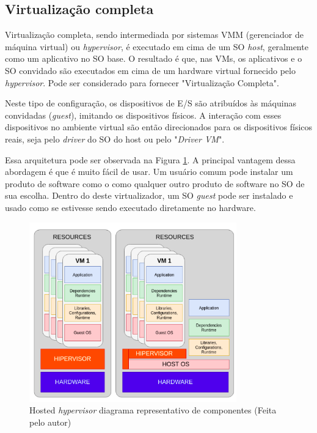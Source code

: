 \subsection{Virtualização completa}

Virtualização completa, sendo intermediada por sistemas VMM (gerenciador de máquina virtual) ou \emph{hypervisor}, é executado em cima de um SO \emph{host}, geralmente como um aplicativo no SO base. O resultado é que, nas VMs, os aplicativos e o SO convidado são executados em cima de um hardware virtual fornecido pelo \emph{hypervisor}. Pode ser considerado para fornecer "Virtualização Completa".

Neste tipo de configuração, os dispositivos de E/S são atribuídos às máquinas convidadas (\emph{guest}), imitando os dispositivos físicos. A interação com esses dispositivos no ambiente virtual são então direcionados para os dispositivos físicos reais, seja pelo \emph{driver} do SO do host ou pelo "\emph{Driver VM}". 

Essa arquitetura pode ser observada na Figura \ref{fig:vms}. A principal vantagem dessa abordagem é que é muito fácil de usar. Um usuário comum pode instalar um produto de software como o  como qualquer outro produto de software no SO de sua escolha. Dentro do deste virtualizador, um SO \emph{guest} pode ser instalado e usado como se estivesse sendo executado diretamente no hardware. \cite{portnoy2012virtualization}

\begin{figure}[!h]
    \centering
    \includegraphics[width=0.8\textwidth]{04-figuras/vms.png}
    \caption[Hosted \emph{hypervisor} diagrama representativo de componentes ]{Hosted \emph{hypervisor} diagrama representativo de componentes (Feita pelo autor)}
    \label{fig:vms}
\end{figure}

